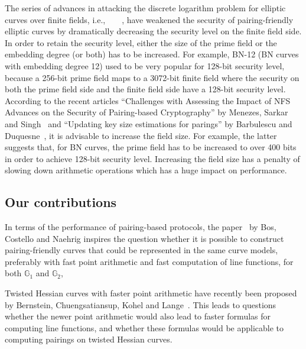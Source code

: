 The series of advances in attacking the discrete logarithm problem for elliptic curves over finite fields,
i.e.,~\cite{2013/jouxP}~\cite{2016/KB}~\cite{2015/BGGM}~\cite{2015/BGK},
have weakened the security of pairing-friendly elliptic curves by dramatically decreasing the security level on the finite field side.
In order to retain the security level, either the size of the prime field or the embedding degree (or both) has to be increased.
For example, BN-12 (BN curves with embedding degree 12) used to be very popular for 128-bit security level,
because a 256-bit prime field maps to a 3072-bit finite field
where the security on both the prime field side and the finite field side have a 128-bit security level.
According to the recent articles
``Challenges with Assessing the Impact of NFS Advances on the Security of Pairing-based Cryptography''
by Menezes, Sarkar and Singh~\cite{2016/MSS}
and ``Updating key size estimations for parings'' by Barbulescu and Duquesne~\cite{2017/keysize},
it is advisable to increase the field size.
For example, the latter suggests that, for BN curves, the prime field has to be increased to over 400 bits in order to achieve 128-bit security level.
Increasing the field size has a penalty of slowing down arithmetic operations which has a huge impact on performance.


\subsection{Our contributions}

In terms of the performance of pairing-based protocols,
the paper~\cite{2013/bos-pairing} by Bos, Costello and Naehrig
inspires the question whether it is possible to
construct pairing-friendly curves that could be represented in the same curve models,
preferably with fast point arithmetic and fast computation of line functions,
for both $\mathbb{G}_1$ and $\mathbb{G}_2$,

Twisted Hessian curves with faster point arithmetic have recently been proposed by
Bernstein, Chuengsatiansup, Kohel and Lange~\cite{2015/hessian}.
This leads to questions whether the newer point arithmetic would also lead to faster formulas for computing line functions,
and whether these formulas would be applicable to computing pairings on twisted Hessian curves.

